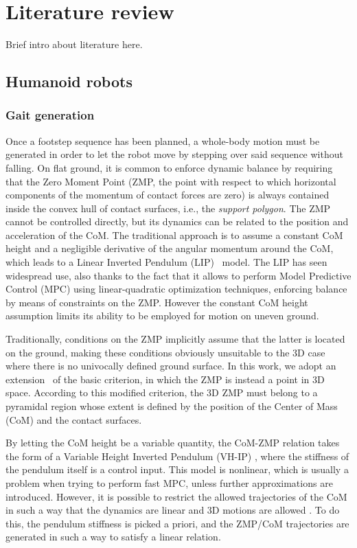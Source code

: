 \chapter{Literature review}
Brief intro about literature here.

\section{Humanoid robots}
\subsection{Gait generation}

Once a footstep sequence has been planned, a whole-body motion must be generated in order to let the robot move by stepping over said sequence without falling. On flat ground, it is common to enforce dynamic balance by requiring that the Zero Moment Point (ZMP, the point with respect to which horizontal components of the momentum of contact forces are zero) is always contained inside the convex hull of contact surfaces, i.e., the \emph{support polygon}.
The ZMP cannot be controlled directly, but its dynamics can be related to the position and acceleration of the CoM. The traditional approach is to assume a constant CoM height and a negligible derivative of the angular momentum around the CoM, which leads to a Linear Inverted Pendulum (LIP)~\cite{Kajita2003BipedWalkingPatternGeneration} model. The LIP has seen widespread use, also thanks to the fact that it allows to perform Model Predictive Control (MPC) using linear-quadratic optimization techniques, enforcing balance by means of constraints on the ZMP. However the constant CoM height assumption limits its ability to be employed for motion on uneven ground.

Traditionally, conditions on the ZMP implicitly assume that the latter is located on the ground, making these conditions obviously unsuitable to the 3D case where there is no univocally defined ground surface. In this work, we adopt an extension~\cite{Sugihara2021ICRA} of the basic criterion, in which the ZMP is instead a point in 3D space. According to this modified criterion, the 3D ZMP must belong to a pyramidal region whose extent is defined by the position of the Center of Mass (CoM) and the contact surfaces.

By letting the CoM height be a variable quantity, the CoM-ZMP relation takes the form of a Variable Height Inverted Pendulum (VH-IP) \cite{Caron2019CapturabilitybasedPatternGeneration}, where the stiffness of the pendulum itself is a control input. This model is nonlinear, which is usually a problem when trying to perform fast MPC, unless further approximations are introduced. However, it is possible to restrict the allowed trajectories of the CoM in such a way that the dynamics are linear and 3D motions are allowed \cite{Zamparelli2018SYROCO, Ferrari2019ECC}. To do this, the pendulum stiffness is picked a priori, and the ZMP/CoM trajectories are generated in such a way to satisfy a linear relation.

